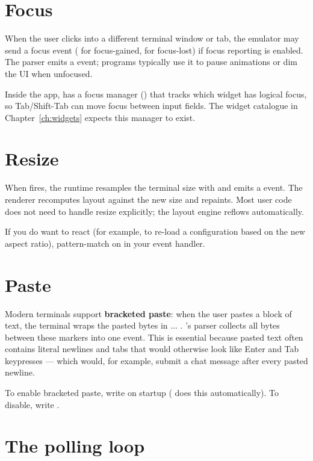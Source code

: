 \section{Focus}

When the user clicks into a different terminal window or tab, the
emulator may send a focus event (\code{ESC [ I} for focus-gained,
\code{ESC [ O} for focus-lost) if focus reporting is enabled. The
parser emits a  event; \maya{}
programs typically use it to pause animations or dim the UI when
unfocused.

Inside the app, \maya{} has a focus manager
() that tracks which widget
has logical focus, so Tab/Shift-Tab can move focus between input
fields. The widget catalogue in Chapter~\ref{ch:widgets} expects
this manager to exist.

\section{Resize}

When  fires, the runtime resamples the terminal size
with  and emits a 
event. The renderer recomputes layout against the new size and
repaints. Most user code does not need to handle resize explicitly;
the layout engine reflows automatically.

If you do want to react (for example, to re-load a configuration
based on the new aspect ratio), pattern-match on  in
your event handler.

\section{Paste}

Modern terminals support \textbf{bracketed paste}: when the user
pastes a block of text, the terminal wraps the pasted bytes in
\code{ESC[200\textasciitilde} ... \code{ESC[201\textasciitilde}.
\maya{}'s parser collects all bytes between these markers into one
 event. This is essential because pasted text
often contains literal newlines and tabs that would otherwise look
like Enter and Tab keypresses --- which would, for example, submit a
chat message after every pasted newline.

To enable bracketed paste, write \code{ESC[?2004h} on startup
(\maya{} does this automatically). To disable, write \code{ESC[?2004l}.

\section{The polling loop}

